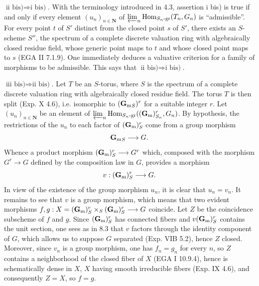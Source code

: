 $\text{ii bis)}\Rightarrow\text{i bis)}$. With the terminology introduced in 4.3, assertion i bis) is true if and only if every element $(u_n)_{n\in\mathbf N}$ of $\varprojlim_n\operatorname{Hom}_{S_n\text{-gr}}(T_n,G_n)$ is ``admissible''. For every point $t$ of $S'$ distinct from the closed point $s$ of $S'$, there exists an $S$-scheme $S''$, the spectrum of a complete discrete valuation ring with algebraically closed residue field, whose generic point maps to $t$ and whose closed point maps to $s$ (EGA II 7.1.9). One immediately deduces a valuative criterion for a family of morphisms to be admissible. This says that $\text{ii bis)}\Rightarrow\text{i bis)}$.

$\text{iii bis)}\Rightarrow\text{ii bis)}$. Let $T$ be an $S$-torus, where $S$ is the spectrum of a complete discrete valuation ring with algebraically closed residue field. The torus $T$ is then split (Exp. X 4.6), i.e. isomorphic to $({\mathbf{G}_{\mathrm{m}}}_S)^r$ for a suitable integer $r$. Let $(u_n)_{n\in\mathbf N}$ be an element of $\varprojlim_n\operatorname{Hom}_{S_n\text{-gr}}((\mathbf{G}_{\mathrm{m}})^r_{S_n},G_n)$. By hypothesis, the restrictions of the $u_n$ to each factor of $(\mathbf{G}_{\mathrm{m}})^r_S$ come from a group morphism
\[
{\mathbf{G}_{\mathrm{m}}}_S\longrightarrow G.
\]
Whence a product morphism $(\mathbf{G}_{\mathrm{m}})^r_S\longrightarrow G^r$ which, composed with the morphism $G^r\to G$ defined by the composition law in $G$, provides a morphism
\[
v:(\mathbf{G}_{\mathrm{m}})^r_S\longrightarrow G.
\]
In view of the existence of the group morphism $u_n$, it is clear that $u_n=v_n$. It remains to see that $v$ is a group morphism, which means that two evident morphisms $f,g:X=(\mathbf{G}_{\mathrm{m}})^r_S\times_S(\mathbf{G}_{\mathrm{m}})^r_S\longrightarrow G$ coincide. Let $Z$ be the coincidence subscheme of $f$ and $g$. Since $(\mathbf{G}_{\mathrm{m}})^r_S$ has connected fibers and $v(\mathbf{G}_{\mathrm{m}})^r_S$ contains the unit section, one sees as in 8.3 that $v$ factors through the identity component of $G$, which allows us to suppose $G$ separated (Exp. VIB 5.2), hence $Z$ closed. Moreover, since $v_n$ is a group morphism, one has $f_n=g_n$ for every $n$, so $Z$ contains a neighborhood of the closed fiber of $X$ (EGA I 10.9.4), hence is schematically dense in $X$, $X$ having smooth irreducible fibers (Exp. IX 4.6), and consequently $Z=X$, so $f=g$.

